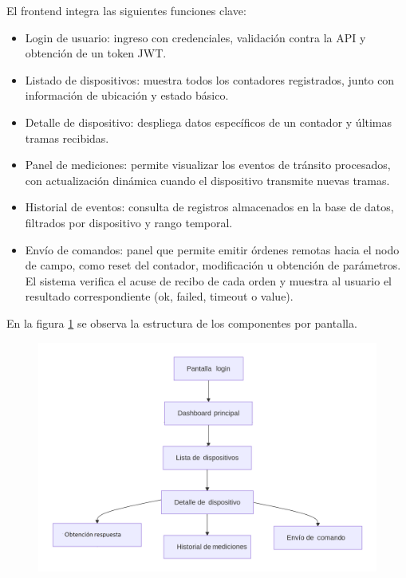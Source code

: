El frontend integra las siguientes funciones clave:
\begin{itemize}
    \item Login de usuario: ingreso con credenciales, validación contra la API y obtención de un token JWT.
    \item Listado de dispositivos: muestra todos los contadores registrados, junto con información de ubicación y estado básico.
    \item Detalle de dispositivo: despliega datos específicos de un contador y últimas tramas recibidas.
    \item Panel de mediciones: permite visualizar los eventos de tránsito procesados, con actualización dinámica cuando el dispositivo transmite nuevas tramas.
    \item Historial de eventos: consulta de registros almacenados en la base de datos, filtrados por dispositivo y rango temporal.
    \item Envío de comandos: panel que permite emitir órdenes remotas hacia el nodo de campo, como reset del contador, modificación u obtención de parámetros. El sistema verifica el acuse de recibo de cada orden y muestra al usuario el resultado correspondiente (ok, failed, timeout o value).
    
\end{itemize}

En la figura \ref{fig:diagrama_controladores} se observa la estructura de los componentes por pantalla.

\begin{figure}[H]
 
  \centering
  \includegraphics[width=1\linewidth]{./Figures/diagEstructuraComponentesPantallasFrontend.png}
  \label{fig:diagrama_controladores}
\end{figure}



